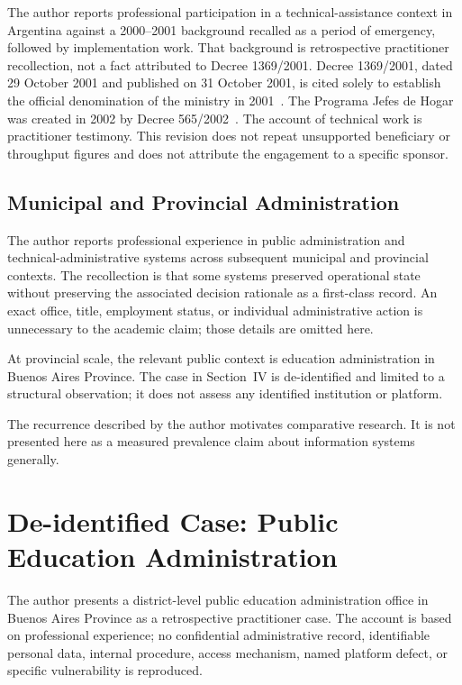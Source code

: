 \documentclass[conference]{IEEEtran}
\begin{document}
The author reports professional participation in a technical-assistance context
in Argentina against a 2000--2001 background recalled as a period of emergency,
followed by implementation work. That background is retrospective practitioner
recollection, not a fact attributed to Decree 1369/2001. Decree 1369/2001, dated
29 October 2001 and published on 31 October 2001, is cited solely to establish
the official denomination of the ministry in 2001~\cite{decree1369}. The
Programa Jefes de Hogar was created in 2002 by Decree
565/2002~\cite{decree565}. The account of technical work is practitioner
testimony. This revision does not repeat unsupported beneficiary or throughput
figures and does not attribute the engagement to a specific sponsor.

\subsection{Municipal and Provincial Administration}

The author reports professional experience in public administration and
technical-administrative systems across subsequent municipal and provincial
contexts. The recollection is that some systems preserved operational state
without preserving the associated decision rationale as a first-class record.
An exact office, title, employment status, or individual administrative action
is unnecessary to the academic claim; those details are omitted here.

At provincial scale, the relevant public context is education administration in
Buenos Aires Province. The case in Section~IV is de-identified and limited to a
structural observation; it does not assess any identified institution or
platform.

The recurrence described by the author motivates comparative research. It is not
presented here as a measured prevalence claim about information systems generally.

\section{De-identified Case: Public Education Administration}

The author presents a district-level public education administration office in
Buenos Aires Province as a retrospective practitioner case. The account is based
on professional experience; no confidential administrative record, identifiable
personal data, internal procedure, access mechanism, named platform defect, or
specific vulnerability is reproduced.
\end{document}
